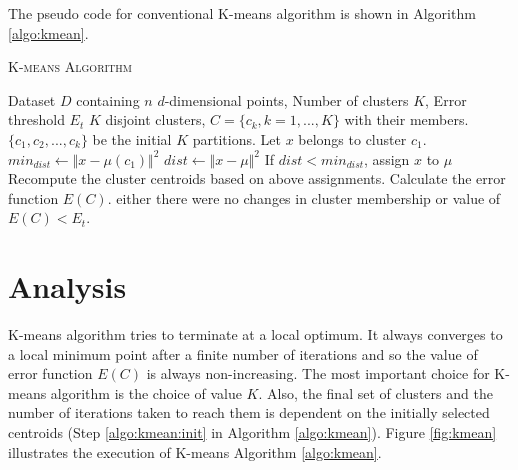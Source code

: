 The pseudo code for conventional K-means algorithm is shown in Algorithm \ref{algo:kmean}. 
\begin{algorithm} 
\caption{\textsc{K-means Algorithm}}
\label{algo:kmean}
\begin{algorithmic}[1]
\REQUIRE Dataset $D$ containing $n$ $d$-dimensional points, Number of clusters $K$, Error threshold $E_{t}$
\ENSURE $K$ disjoint clusters, $C = \lbrace c_{k}, k = 1,...,K\rbrace$ with their members.
\STATE $\lbrace c_{1},c_{2},...,c_{k}\rbrace$ be the initial $K$ partitions.\label{algo:kmean:init}
\REPEAT
 \label{algo:kmean:nearest}
	\STATE Let $x$ belongs to cluster $c_{1}$.
	\STATE $min_{dist} \gets \Vert x - \mu \left(c_{1}\right)\Vert^{2}$
		\STATE $dist \gets \Vert x - \mu\Vert^{2}$
		\STATE If $dist < min_{dist}$, assign $x$ to $\mu$
	\ENDFOR
\ENDFOR
\STATE Recompute the cluster centroids based on above assignments. \label{algo:kmean:compute}
\STATE Calculate the error function $E\left(C\right)$.
\UNTIL either there were no changes in cluster membership or value of $E\left(C\right) < E_{t}$. \label{algo:kmean:term}
\end{algorithmic}
\end{algorithm}


\section{Analysis}
K-means algorithm tries to terminate at a local optimum. It always converges to a local minimum point \cite{selim} after a finite number of iterations and so the value of error function $E\left(C\right)$ is always non-increasing.
The most important choice for K-means algorithm is the choice of value $K$. Also, the final set of clusters and the number of iterations taken to reach them is dependent on the initially selected centroids (Step \ref{algo:kmean:init} in Algorithm \ref{algo:kmean}). Figure \ref{fig:kmean} illustrates the execution of K-means Algorithm \ref{algo:kmean}.

